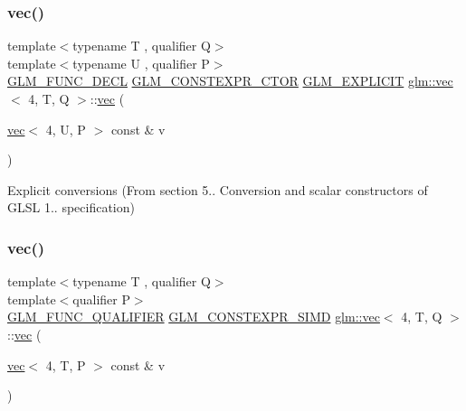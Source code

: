 \subsubsection{\texorpdfstring{vec()}{vec()}\hspace{0.1cm}{\footnotesize\ttfamily [19/34]}}
{\footnotesize\ttfamily template$<$typename T , qualifier Q$>$ \\
template$<$typename U , qualifier P$>$ \\
\mbox{\hyperlink{setup_8hpp_ab2d052de21a70539923e9bcbf6e83a51}{G\+L\+M\+\_\+\+F\+U\+N\+C\+\_\+\+D\+E\+CL}} \mbox{\hyperlink{setup_8hpp_ad34178a09666081abdb573c14d1f4a5a}{G\+L\+M\+\_\+\+C\+O\+N\+S\+T\+E\+X\+P\+R\+\_\+\+C\+T\+OR}} \mbox{\hyperlink{setup_8hpp_a6c74f5a5e7b134ab69023ff9a30d4d5d}{G\+L\+M\+\_\+\+E\+X\+P\+L\+I\+C\+IT}} \mbox{\hyperlink{structglm_1_1vec}{glm\+::vec}}$<$ 4, T, Q $>$\+::\mbox{\hyperlink{structglm_1_1vec}{vec}} (\begin{DoxyParamCaption}\item[{\mbox{\hyperlink{structglm_1_1vec}{vec}}$<$ 4, U, P $>$ const \&}]{v }\end{DoxyParamCaption})}



Explicit conversions (From section 5.. Conversion and scalar constructors of G\+L\+SL 1.. specification) 

\mbox{\label{structglm_1_1vec_3_014_00_01_t_00_01_q_01_4_a29d7b0c6bd124719542646f92272f061}} 
\subsubsection{\texorpdfstring{vec()}{vec()}\hspace{0.1cm}{\footnotesize\ttfamily [20/34]}}
{\footnotesize\ttfamily template$<$typename T , qualifier Q$>$ \\
template$<$qualifier P$>$ \\
\mbox{\hyperlink{setup_8hpp_a33fdea6f91c5f834105f7415e2a64407}{G\+L\+M\+\_\+\+F\+U\+N\+C\+\_\+\+Q\+U\+A\+L\+I\+F\+I\+ER}} \mbox{\hyperlink{setup_8hpp_ae5de828d10226b21e2123dd61f3cb5ed}{G\+L\+M\+\_\+\+C\+O\+N\+S\+T\+E\+X\+P\+R\+\_\+\+S\+I\+MD}} \mbox{\hyperlink{structglm_1_1vec}{glm\+::vec}}$<$ 4, T, Q $>$\+::\mbox{\hyperlink{structglm_1_1vec}{vec}} (\begin{DoxyParamCaption}\item[{\mbox{\hyperlink{structglm_1_1vec}{vec}}$<$ 4, T, P $>$ const \&}]{v }\end{DoxyParamCaption})}



